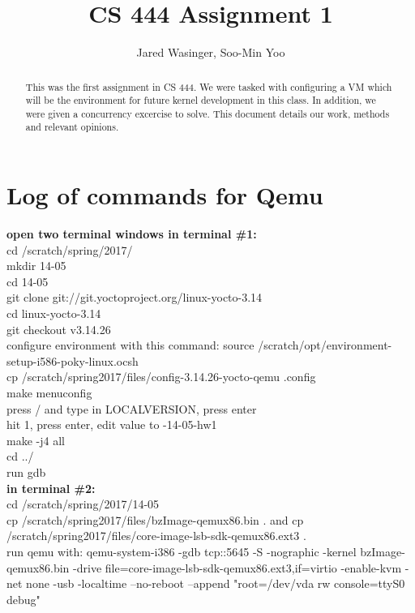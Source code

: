 \documentclass[letterpaper,10pt]{article}
\title{CS 444 Assignment 1}
\author{Jared Wasinger, Soo-Min Yoo}
\begin{document}
\maketitle

\begin{abstract}
	This was the first assignment in CS 444.  We were tasked with configuring a VM which will be the environment for future kernel development in this class.  In addition, we were given a concurrency excercise to solve.  This document details our work, methods and relevant opinions.
\end{abstract}
\newpage

\tableofcontents

\newpage



\section{Log of commands for Qemu}


\textbf{open two terminal windows in terminal \#1:}\\
  cd /scratch/spring/2017/\\
  mkdir 14-05\\
  cd 14-05\\
  git clone git://git.yoctoproject.org/linux-yocto-3.14\\
  cd linux-yocto-3.14\\
  git checkout v3.14.26\\
  configure environment with this command: source /scratch/opt/environment-setup-i586-poky-linux.ocsh\\
  cp /scratch/spring2017/files/config-3.14.26-yocto-qemu .config\\
  make menuconfig\\
  press / and type in LOCALVERSION, press enter\\
  hit 1, press enter, edit value to -14-05-hw1\\
  make -j4 all\\
  cd ../\\
  run gdb\\

\textbf{in terminal \#2:}\\
  cd /scratch/spring/2017/14-05\\
  cp /scratch/spring2017/files/bzImage-qemux86.bin . and cp /scratch/spring2017/files/core-image-lsb-sdk-qemux86.ext3 .\\
  run qemu with: qemu-system-i386 -gdb tcp::5645 -S -nographic -kernel bzImage-qemux86.bin -drive file=core-image-lsb-sdk-qemux86.ext3,if=virtio -enable-kvm -net none -usb -localtime --no-reboot --append "root=/dev/vda rw console=ttyS0 debug"\\
\end{document}
